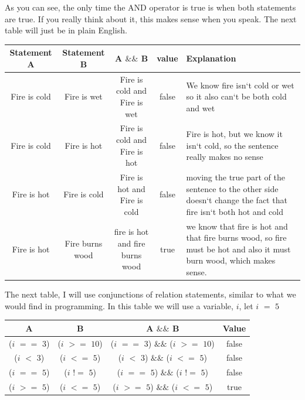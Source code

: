 \documentclass[11]{article}
\begin{document}
As you can see, the only time the AND operator is true is when both statements are true. If you really think about it, this makes sense when you speak. The next table will just be in plain English.

\begin{center}
  \begin{tabular}{ | c | c | c | c | p{4.5cm} |}
    \hline
		Statement A & Statement B & A $\&\&$ B & value & Explanation \\ \hline
		Fire is cold & Fire is wet & Fire is cold and Fire is wet & false & We know fire isn`t cold or wet so it also can`t be both cold and wet \\  \hline
		
		Fire is cold & Fire is hot & Fire is cold and Fire is hot & false & Fire is hot, but we know it isn`t cold, so the sentence really makes no sense \\ \hline
		
		Fire is hot & Fire is cold & Fire is hot and Fire is cold & false & moving the true part of the sentence to the other side doesn`t change the fact that fire isn`t both hot and cold \\ \hline
		
		Fire is hot & Fire burns wood & fire is hot and fire burns wood & true & we know that fire is hot and that fire burns wood, so fire must be hot and also it must burn wood, which makes sense. \\
    \hline
  \end{tabular}
\end{center}

The next table, I will use conjunctions of relation statements, similar to what we would find in programming. In this table we will use a variable, $i$, let $i$ $=$ $5$

\begin{center}
  \begin{tabular}{ | c | c | c | c |}
    \hline
    A & B & A $\&\&$ B & Value\\ \hline
    ($i$ $==$ $3$) & ($i$ $>=$ $10$) & ($i$ $==$ $3$) $\&\&$ ($i$ $>=$ $10$) & false \\ \hline
    ($i$ $<$ $3$) & ($i$ $<=$ $5$) & ($i$ $<$ $3$) $\&\&$ ($i$ $<=$ $5$) & false \\ \hline
    ($i$ $==$ $5$) & ($i$ $!=$ $5$) &  ($i$ $==$ $5$) $\&\&$ ($i$ $!=$ $5$)& false \\ \hline
    ($i$ $>=$ $5$) & ($i$ $<=$ $5$) & ($i$ $>=$ $5$) $\&\&$ ($i$ $<=$ $5$) & true \\
    \hline
  \end{tabular}
\end{center}
\end{document}
